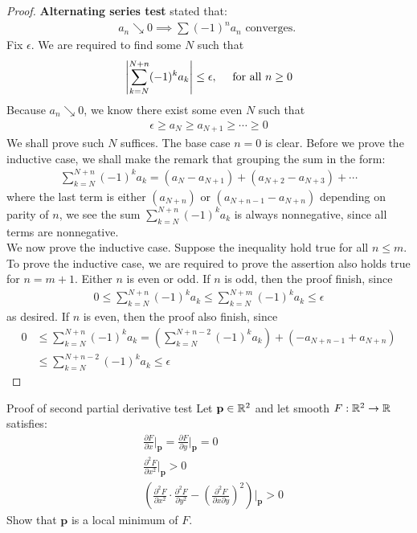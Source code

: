 \documentclass{report}
\begin{document}
\begin{proof}
\textbf{Alternating series test} stated that: 
\begin{align*}
a_n \searrow 0 \implies \sum (-1)^n a_n \text{ converges. }
\end{align*}
Fix $\epsilon $. We are required to find some $N$ such that 
\begin{align*}
\left|\sum_{k=N}^{N+n} (-1)^k a_k\right| \leq \epsilon ,\quad \text{ for all }n \geq 0
\end{align*}
Because $a_n\searrow 0$, we know there exist some even $N$ such that 
\begin{align*}
 \epsilon \geq a_N \geq a_{N+1} \geq \cdots \geq  0
\end{align*}
We shall prove such $N$ suffices. The base case $n=0$ is clear. Before we prove the inductive case, we shall make the remark that grouping the sum in the form: 
\begin{align*}
\sum_{k=N}^{N+n} (-1)^k a_k = (a_N-a_{N+1}) + (a_{N+2}-a_{N+3}) + \cdots 
\end{align*}
where the last term is either $(a_{N+n})$ or $(a_{N+n-1}-a_{N+n})$ depending on parity of $n$, we see the sum $\sum_{k=N}^{N+n}(-1)^ka_k$ is always nonnegative, since all terms are nonnegative.\\

We now prove the inductive case.  Suppose the inequality hold true for all $n\leq m$. To prove the inductive case, we are required to prove the assertion also holds true for $n=m+1$. Either $n$ is even or odd. If $n$ is odd, then the proof finish, since 
\begin{align*}
0 \leq \sum_{k=N}^{N+n} (-1)^k a_k \leq \sum_{k=N}^{N+m}(-1)^ka_k \leq \epsilon 
\end{align*}
as desired. If $n$ is even, then the proof also finish, since
\begin{align*}
  0 &\leq \sum_{k=N}^{N+n}(-1)^k a_k= \left(\sum_{k=N}^{N+n-2}(-1)^k a_k \right) + (-a_{N+n-1}  +a_{N+n})\\
  &\leq \sum_{k=N}^{N+n-2} (-1)^k a_k \leq \epsilon 
\end{align*}
\end{proof}
\begin{question}{Proof of second partial derivative test}{}
Let $\textbf{p} \in\mathbb{R}^2$ and let smooth $F:\mathbb{R}^2\rightarrow \mathbb{R}$ satisfies: 
\begin{align*}
  &\frac{\partial F}{\partial x}\Bigg|_\textbf{p}=\frac{\partial F}{\partial y}\Bigg|_\textbf{p}=0\\
  &\frac{\partial^2 F}{\partial x^2}\Bigg|_\textbf{p}>0   \\
  &\left( \frac{\partial^2 F}{\partial x^2} \cdot \frac{\partial ^2 F}{\partial y^2} - \left(\frac{\partial^2 F}{\partial x\partial y} \right)^2\right) \Bigg|_\textbf{p} >0
\end{align*}
Show that $\textbf{p}$ is a local minimum of  $F$. 
\end{question}
\end{document}
